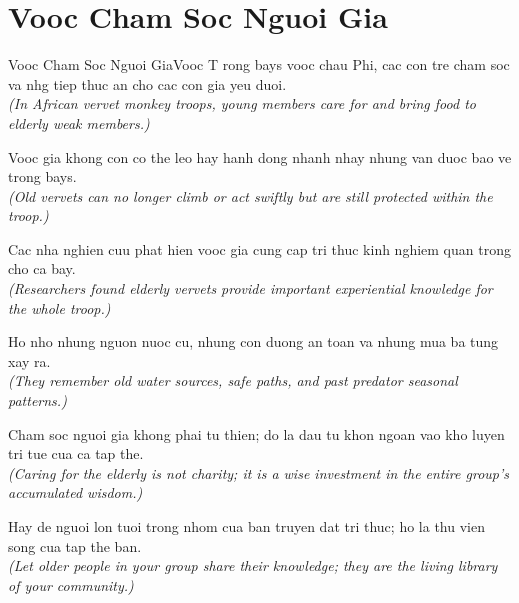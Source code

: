 \section{Vooc Cham Soc Nguoi Gia}
\begin{truyen}{Vooc Cham Soc Nguoi Gia}{Vooc}
T rong bays vooc chau Phi, cac con tre cham soc va nhg tiep thuc an cho cac con gia yeu duoi.\\
\textit{(In African vervet monkey troops, young members care for and bring food to elderly weak members.)}

Vooc gia khong con co the leo hay hanh dong nhanh nhay nhung van duoc bao ve trong bays.\\
\textit{(Old vervets can no longer climb or act swiftly but are still protected within the troop.)}

Cac nha nghien cuu phat hien vooc gia cung cap tri thuc kinh nghiem quan trong cho ca bay.\\
\textit{(Researchers found elderly vervets provide important experiential knowledge for the whole troop.)}

Ho nho nhung nguon nuoc cu, nhung con duong an toan va nhung mua ba tung xay ra.\\
\textit{(They remember old water sources, safe paths, and past predator seasonal patterns.)}

Cham soc nguoi gia khong phai tu thien; do la dau tu khon ngoan vao kho luyen tri tue cua ca tap the.\\
\textit{(Caring for the elderly is not charity; it is a wise investment in the entire group's accumulated wisdom.)}

\end{truyen}
\begin{baihoc}
  Hay de nguoi lon tuoi trong nhom cua ban truyen dat tri thuc; ho la thu vien song cua tap the ban.\\
  \textit{(Let older people in your group share their knowledge; they are the living library of your community.)}
\end{baihoc}


